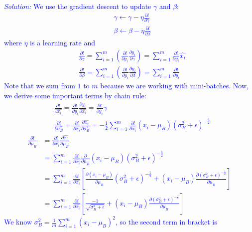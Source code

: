 \documentclass{article}
\def\solColor{blue}
\begin{document}
\textcolor{\solColor}{\textit{Solution:}
We use the gradient descent to update $\gamma$ and $\beta$:
\begin{align*}
    &\gamma \leftarrow \gamma - \eta\frac{\partial l}{\partial \gamma} \\ 
    &\beta\leftarrow \beta - \eta\frac{\partial l}{\partial \beta}
\end{align*}
where $\eta$ is a learning rate and 
\begin{align*}
    &\frac{\partial l}{\partial \gamma} = \sum_{i=1}^m\left(\frac{\partial l}{\partial y_i}\frac{\partial y_i}{\partial \gamma}\right) = \sum_{i=1}^m\frac{\partial l}{\partial y_i}\hat{x_i}\\
    &\frac{\partial l}{\partial \beta} = \sum_{i=1}^m\left(\frac{\partial l}{\partial y_i}\frac{\partial y_i}{\partial \beta}\right) = \sum_{i=1}^m\frac{\partial l}{\partial y_i}
\end{align*}
Note that we sum from $1$ to $m$ because we are working with mini-batches.
Now, we derive some important terms by chain rule:
\begin{align*}
    &\frac{\partial l}{\partial \hat{x_i}} = \frac{\partial l}{\partial y_i}\frac{\partial y_i}{\partial \hat{x_i}} = \frac{\partial l}{\partial y_i}\gamma\\
    &\frac{\partial l}{\partial \sigma^2_B} = \frac{\partial l}{\partial \hat{x_i}}\frac{\partial \hat{x_i}}{\partial \sigma^2_B} = -\frac{1}{2}\sum_{i=1}^m\frac{\partial l}{\partial \hat{x_i}}(x_i-\mu_B)(\sigma_B^2+\epsilon)^{-\frac{3}{2}}
\end{align*}
\begin{align*}
    \frac{\partial l}{\partial \mu_B}  &= \frac{\partial l}{\partial \hat{x_i}}\frac{\partial \hat{x_i}}{\partial \mu_B}\\
    &= \sum_{i=1}^m \frac{\partial l}{\partial \hat{x_i}} \frac{\partial}{\partial \mu_B} (x_i-\mu_B)(\sigma^2_B+\epsilon)^{-\frac{1}{2}}\\
    &= \sum_{i=1}^{m}\frac{\partial l}{\partial \hat{x_i}}\left[ \frac{\partial (x_i - \mu_B)}{\partial \mu_B}(\sigma^2_B + \epsilon)^{-\frac{1}{2}} + (x_i - \mu_B)\frac{\partial (\sigma^2_B + \epsilon)^{-\frac{1}{2}}}{\partial \mu_B} \right]\\
    &= \sum_{i=1}^{m}\frac{\partial l}{\partial \hat{x_i}}\left[\frac{-1}{\sqrt{\sigma^2_B + \epsilon}} + (x_i - \mu_B)\frac{\partial (\sigma^2_B + \epsilon)^{-\frac{1}{2}}}{\partial \mu_B} \right]
\end{align*}
We know $\sigma^2_B = \frac{1}{m} \sum^{m}_{i=1}(x_i-\mu _B)^2$, so the second term in bracket is
}
\end{document}
